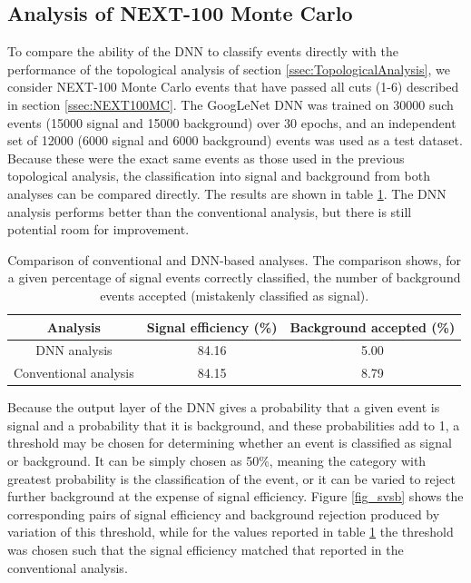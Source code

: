 \documentclass{JINST}
\begin{document}
\subsection{Analysis of NEXT-100 Monte Carlo}\label{ssec:NEXTMCanalysis}
To compare the ability of the DNN to classify events directly with the performance of the topological analysis of section \ref{ssec:TopologicalAnalysis}, we consider NEXT-100 Monte Carlo 
events that have passed all cuts (1-6) described in section \ref{ssec:NEXT100MC}.  The GoogLeNet DNN was trained on 30000 such events (15000 signal and 15000 background) over 30 epochs, 
and an independent set of 12000 (6000 signal and 6000 background) events was used as a test dataset.  Because these were the exact same events as those used in the previous
topological analysis, the classification into signal and background from both analyses can be compared directly.  The results are shown in table \ref{tbl.DNNcomparison}.  The DNN
analysis performs better than the conventional analysis, but there is still potential room for improvement.  
	
\begin{table}[!htb]
	\begin{center}
		\caption[DNN analysis summary]{\label{tbl.DNNcomparison}Comparison of conventional and DNN-based analyses.  The comparison shows, for a given percentage of signal events
			correctly classified, the number of background events accepted (mistakenly classified as signal).}
		\begin{tabular}{ccc}
			\\
			\textbf{Analysis} & \textbf{Signal efficiency (\%)} & \textbf{Background accepted (\%)}\\
			\hline
			DNN analysis & 84.16 & 5.00\\
			Conventional analysis & 84.15 & 8.79\\
		\end{tabular}
	\end{center}
\end{table}

Because the output layer of the DNN gives a probability that a given event is signal and a probability that it is background, and these probabilities add to 1, a threshold may be 
chosen for determining whether an event is classified as signal or background.  It can be simply chosen as 50\%, meaning the category with greatest probability is the classification of the
event, or it can be varied to reject further background at the expense of signal efficiency.  Figure \ref{fig_svsb} shows the corresponding pairs of signal efficiency and background 
rejection produced by variation of this threshold, while for the values reported in table \ref{tbl.DNNcomparison} the threshold was chosen such that the signal efficiency matched that reported in 
the conventional analysis.
\end{document}
